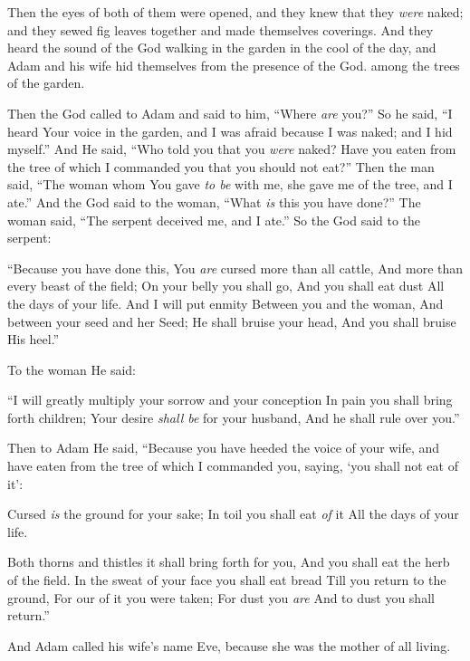 \bverse Then the eyes of both of them were opened, and they knew that they \textit{were} naked; and they sewed fig leaves together and made themselves coverings.
\bverse And they heard the sound of the \lord God walking in the garden in the cool of the day, and Adam and his wife hid themselves from the presence of the \lord God. among the trees of the garden.

\bverse Then the \lord God called to Adam and said to him, ``Where \textit{are} you?''
\bverse So he said, ``I heard Your voice in the garden, and I was afraid because I was naked; and I hid myself.''
\bverse And He said, ``Who told you that you \textit{were} naked? Have you eaten from the tree of which I commanded you that you should not eat?''
\bverse Then the man said, ``The woman whom You gave \textit{to be} with me, she gave me of the tree, and I ate.''
\bverse And the \lord God said to the woman, ``What \textit{is} this you have done?'' The woman said, ``The serpent deceived me, and I ate.''
\bverse So the \lord God said to the serpent: 
\begin{bquotation}
``Because you have done this, You \textit{are} cursed more than all cattle, And more than every beast of the field; On your belly you shall go, And you shall eat dust All the days of your life.
\bverse And I will put enmity Between you and the woman, And between your seed and her Seed; He shall bruise your head, And you shall bruise His heel.''
\end{bquotation}
\bverse To the woman He said: 
\begin{bquotation}
``I will greatly multiply your sorrow and your conception In pain you shall bring forth children; Your desire \textit{shall be} for your husband, And he shall rule over you.''
\end{bquotation}
\bverse Then to Adam He said, ``Because you have heeded the voice of your wife, and have eaten from the tree of which I commanded you, saying, `you shall not eat of it':
\begin{bquotation}
Cursed \textit{is} the ground for your sake; In toil you shall eat \textit{of} it All the days of your life.

\bverse Both thorns and thistles it shall bring forth for you, And you shall eat the herb of the field.
\bverse In the sweat of your face you shall eat bread Till you return to the ground, For our of it you were taken; For dust you \textit{are} And to dust you shall return.''
\end{bquotation}
\bverse And Adam called his wife's name Eve, because she was the mother of all living.

